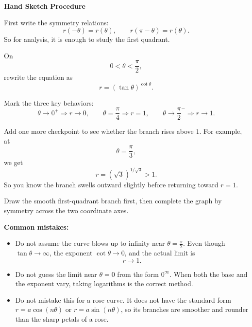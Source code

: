\documentclass[a4paper,12pt,twocolumn]{article}
\newenvironment{solutionbox}{\begin{framed}}{\end{framed}}
\begin{document}
\begin{solutionbox}
\textbf{Hand Sketch Procedure}

\begin{steps}
\item First write the symmetry relations:
\[
r(-\theta)=r(\theta),
\qquad
r(\pi-\theta)=r(\theta).
\]
So for analysis, it is enough to study the first quadrant.

\item On
\[
0<\theta<\frac{\pi}{2},
\]
rewrite the equation as
\[
r=(\tan\theta)^{\cot\theta}.
\]

\item Mark the three key behaviors:
\[
\theta\to 0^+ \Rightarrow r\to 0,
\qquad
\theta=\frac{\pi}{4} \Rightarrow r=1,
\qquad
\theta\to \frac{\pi}{2}^{-} \Rightarrow r\to 1.
\]
\item Add one more checkpoint to see whether the branch rises above \(1\). For example, at
\[
\theta=\frac{\pi}{3},
\]
we get
\[
r=(\sqrt3)^{1/\sqrt3}>1.
\]
So you know the branch swells outward slightly before returning toward \(r=1\).

\item Draw the smooth first-quadrant branch first, then complete the graph by symmetry across the two coordinate axes.
\end{steps}

\medskip
\noindent\textbf{Common mistakes:}
\begin{itemize}[leftmargin=*]
\item Do not assume the curve blows up to infinity near \(\theta=\frac{\pi}{2}\). Even though \(\tan\theta\to\infty\), the exponent \(\cot\theta\to 0\), and the actual limit is
\[
r\to 1.
\]
\item Do not guess the limit near \(\theta=0\) from the form \(0^\infty\). When both the base and the exponent vary, taking logarithms is the correct method.
\item Do not mistake this for a rose curve. It does not have the standard form \(r=a\cos(n\theta)\) or \(r=a\sin(n\theta)\), so its branches are smoother and rounder than the sharp petals of a rose.
\end{itemize}
\end{solutionbox}
\end{document}
